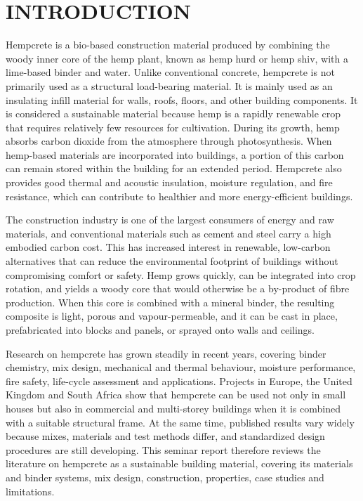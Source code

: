 \documentclass[12pt,a4paper,final]{report}
\begin{document}
\chapter{INTRODUCTION}

Hempcrete is a bio-based construction material produced by combining the woody inner core
of the hemp plant, known as hemp hurd or hemp shiv, with a lime-based binder and water.
Unlike conventional concrete, hempcrete is not primarily used as a structural load-bearing
material. It is mainly used as an insulating infill material for walls, roofs, floors, and other
building components. It is considered a sustainable material because hemp is a rapidly
renewable crop that requires relatively few resources for cultivation. During its growth, hemp
absorbs carbon dioxide from the atmosphere through photosynthesis. When hemp-based
materials are incorporated into buildings, a portion of this carbon can remain stored within
the building for an extended period. Hempcrete also provides good thermal and acoustic
insulation, moisture regulation, and fire resistance, which can contribute to healthier and
more energy-efficient buildings.

\vspace{18.5pt}
The construction industry is one of the largest consumers of energy and raw materials, and
conventional materials such as cement and steel carry a high embodied carbon cost. This has
increased interest in renewable, low-carbon alternatives that can reduce the environmental
footprint of buildings without compromising comfort or safety. Hemp grows quickly, can be
integrated into crop rotation, and yields a woody core that would otherwise be a by-product
of fibre production. When this core is combined with a mineral binder, the resulting composite
is light, porous and vapour-permeable, and it can be cast in place, prefabricated into blocks
and panels, or sprayed onto walls and ceilings.

\vspace{18.5pt}
Research on hempcrete has grown steadily in recent years, covering binder chemistry, mix
design, mechanical and thermal behaviour, moisture performance, fire safety, life-cycle
assessment and applications. Projects in Europe, the United Kingdom and South
Africa show that hempcrete can be used not only in small houses but also in commercial and
multi-storey buildings when it is combined with a suitable structural frame. At the same time,
published results vary widely because mixes, materials and test methods differ, and
standardized design procedures are still developing. This seminar report therefore reviews the
literature on hempcrete as a sustainable building material, covering its materials and binder
systems, mix design, construction, properties, case studies and limitations.
\end{document}
